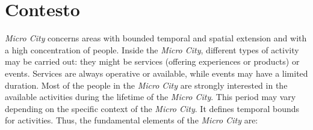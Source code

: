 \section{Contesto}
\textit{Micro City} concerns areas with bounded temporal and spatial extension and with a high concentration of people.
Inside the \textit{Micro City}, different types of activity may be carried out: they might be services (offering experiences or products) or events. Services are always operative or available, while events may have a limited duration.
Most of the people in the \textit{Micro City} are strongly interested in the available activities during the lifetime of the \textit{Micro City}. This period may vary depending on the specific context of the \textit{Micro City}. It defines temporal bounds for activities.
Thus, the fundamental elements of the \textit{Micro City} are:
